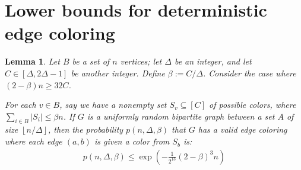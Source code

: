 \documentclass[10pt]{article}
\newtheorem{lemma}[theorem]{Lemma}
\theoremstyle{definition}\newtheorem{definition}[lemma]{Definition}
\theoremstyle{remark}  \newtheorem*{remark}{Remark}
\newcommand{\floor}[1]{{\left\lfloor{#1}\right\rfloor}}
\begin{document}
\section{Lower bounds for deterministic edge coloring}

\begin{lemma}\label{lem:lb-rand-part-matching}
  Let $B$ be a set of $n$ vertices; let $\Delta$ be an integer, and let $C \in [\Delta, 2 \Delta - 1]$ be another integer. Define $\beta := C / \Delta$. Consider the case where $(2 - \beta) n \ge 32 C$.
  
  For each $v \in B$, say we have a nonempty set $S_v \subseteq [C]$ of possible colors, where $\sum_{i \in B} |S_i| \le \beta n$. If $G$ is a uniformly random bipartite graph between a set $A$ of size $\floor{n/\Delta}$, then the probability $p(n, \Delta, \beta)$ that $G$ has a valid edge coloring where each edge $(a,b)$ is given a color from $S_b$ is:
  \begin{align}
      p(n, \Delta, \beta) \le \exp(- \frac{1}{2^{13}} (2-\beta)^3 n) \label{eq:rgmprob}
  \end{align}
\end{lemma}
\end{document}
